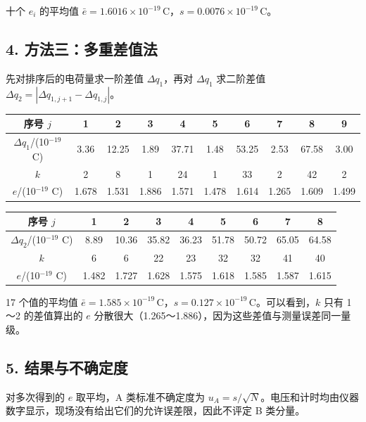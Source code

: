 十个 $e_i$ 的平均值 $\bar e=1.6016\times10^{-19}\,\mathrm{C}$，$s=0.0076\times10^{-19}\,\mathrm{C}$。

\subsection*{4. 方法三：多重差值法}

先对排序后的电荷量求一阶差值 $\Delta q_1$，再对 $\Delta q_1$ 求二阶差值 $\Delta q_2=|\Delta q_{1,j+1}-\Delta q_{1,j}|$。

\begin{center}\small\setlength{\tabcolsep}{4pt}
\begin{tabular}{cccccccccc}
\toprule
序号 $j$ & 1 & 2 & 3 & 4 & 5 & 6 & 7 & 8 & 9 \\
\midrule
$\Delta q_1$/(10$^{-19}$ C) & 3.36 & 12.25 & 1.89 & 37.71 & 1.48 & 53.25 & 2.53 & 67.58 & 3.00 \\
$k$ & 2 & 8 & 1 & 24 & 1 & 33 & 2 & 42 & 2 \\
$e$/(10$^{-19}$ C) & 1.678 & 1.531 & 1.886 & 1.571 & 1.478 & 1.614 & 1.265 & 1.609 & 1.499 \\
\bottomrule\end{tabular}\end{center}

\begin{center}\small\setlength{\tabcolsep}{4pt}
\begin{tabular}{ccccccccc}
\toprule
序号 $j$ & 1 & 2 & 3 & 4 & 5 & 6 & 7 & 8 \\
\midrule
$\Delta q_2$/(10$^{-19}$ C) & 8.89 & 10.36 & 35.82 & 36.23 & 51.78 & 50.72 & 65.05 & 64.58 \\
$k$ & 6 & 6 & 22 & 23 & 32 & 32 & 41 & 40 \\
$e$/(10$^{-19}$ C) & 1.482 & 1.727 & 1.628 & 1.575 & 1.618 & 1.585 & 1.587 & 1.615 \\
\bottomrule\end{tabular}\end{center}

17 个值的平均值 $\bar e=1.585\times10^{-19}\,\mathrm{C}$，$s=0.127\times10^{-19}\,\mathrm{C}$。可以看到，$k$ 只有 1～2 的差值算出的 $e$ 分散很大（1.265～1.886），因为这些差值与测量误差同一量级。

\subsection*{5. 结果与不确定度}

对多次得到的 $e$ 取平均，A 类标准不确定度为 $u_A=s/\sqrt N$。电压和计时均由仪器数字显示，现场没有给出它们的允许误差限，因此不评定 B 类分量。

